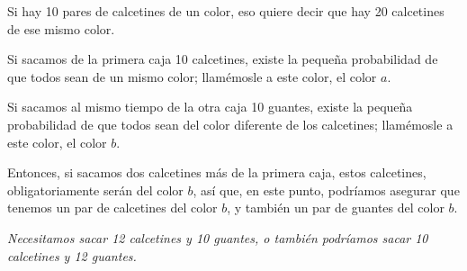 Si hay 10 pares de calcetines de un color, eso quiere decir que hay 20 calcetines de ese mismo color.

Si sacamos de la primera caja 10 calcetines, existe la pequeña probabilidad de que todos sean de un mismo color; llamémosle a este color, el color $a$.

Si sacamos al mismo tiempo de la otra caja 10 guantes, existe la pequeña probabilidad de que todos sean del color diferente de los calcetines; llamémosle a este color, el color $b$.

Entonces, si sacamos dos calcetines más de la primera caja, estos calcetines, obligatoriamente serán del color $b$, así que, en este punto, podríamos asegurar que tenemos un par de calcetines del color $b$, y también un par de guantes del color $b$.

\begin{center}
  \textit{Necesitamos sacar 12 calcetines y 10 guantes, o también podríamos sacar 10 calcetines y 12 guantes.}
\end{center}

